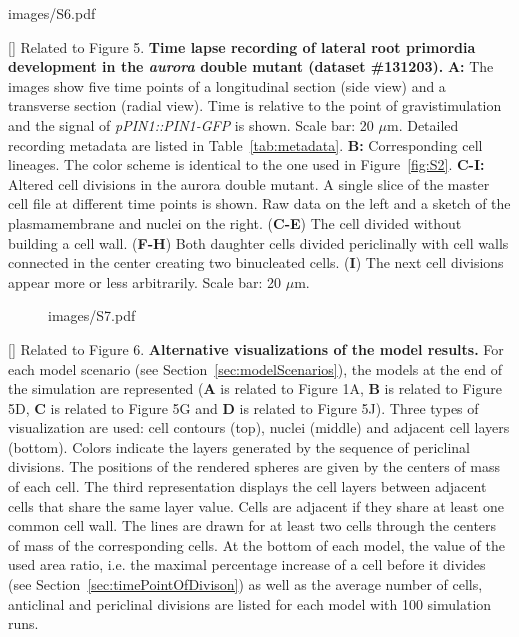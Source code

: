 %
\begin{sidewaysfigure}
\centering
	\begin{overpic}[width=1.\linewidth]{images/S6.pdf}
	\end{overpic}
\end{sidewaysfigure}
\clearpage
{}[]{
Related to Figure 5.
{\bf Time lapse recording of lateral root primordia development in the \emph{aurora} double mutant (dataset \#131203).}
{\bf A:} The images show five time points of a longitudinal section (side view) and a transverse section (radial view). Time is relative to the point of gravistimulation and the signal of \emph{pPIN1::PIN1-GFP }is shown. Scale bar: 20 $\mu$m. Detailed recording metadata are listed in Table~\ref{tab:metadata}. {\bf B:} Corresponding cell lineages. The color scheme is identical to the one used in Figure~\ref{fig:S2}. {\bf C-I:} Altered cell divisions in the aurora double mutant. A single slice of the master cell file at different time points is shown. Raw data on the left and a sketch of the plasmamembrane and nuclei on the right. (\textbf{C-E}) The cell divided without building a cell wall. (\textbf{F-H}) Both daughter cells divided periclinally with cell walls connected in the center creating two binucleated cells. (\textbf{I}) The next cell divisions appear more or less arbitrarily. Scale bar: 20 $\mu$m.
}
\label{fig:S6}
%
\clearpage
%
\begin{figure}[htbp]
\centering
	\begin{overpic}[width=1.\linewidth]{images/S7.pdf}
	\end{overpic}
\end{figure}
\clearpage
{}[]{
Related to Figure 6.
{\bf Alternative visualizations of the model results.} For each model scenario (see Section~\ref{sec:modelScenarios}), the models at the end of the simulation are represented (\textbf{A} is related to Figure 1A, \textbf{B} is related to Figure 5D, \textbf{C} is related to Figure 5G and \textbf{D} is related to Figure 5J). Three types of visualization are used: cell contours (top), nuclei (middle) and adjacent cell layers (bottom). Colors indicate the layers generated by the sequence of periclinal divisions. The positions of the rendered spheres are given by the centers of mass of each cell. The third representation displays the cell layers between adjacent cells that share the same layer value. Cells are adjacent if they share at least one common cell wall. The lines are drawn for at least two cells through the centers of mass of the corresponding cells. At the bottom of each model, the value of the used area ratio, i.e. the maximal percentage increase of a cell before it divides (see Section~\ref{sec:timePointOfDivison}) as well as the average number of cells, anticlinal and periclinal divisions are listed for each model with 100 simulation runs.
}
\label{fig:S7}
%
\clearpage


